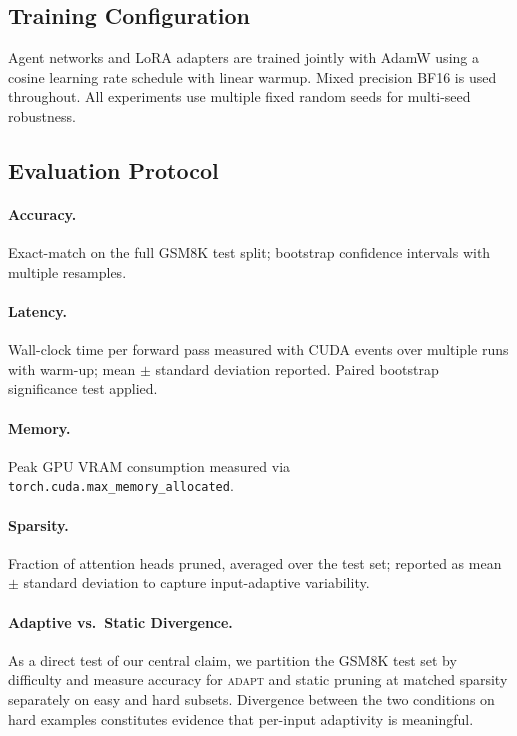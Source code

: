 \documentclass{article}
\newcommand{\system}{\textsc{adapt}}
\begin{document}
\subsection{Training Configuration}
\label{sec:exp_training}

Agent networks and LoRA adapters are trained jointly with AdamW
\citep{loshchilov2019decoupled} using a cosine learning rate schedule with linear warmup.
Mixed precision BF16 is used throughout. All experiments use multiple fixed random seeds
for multi-seed robustness.

\subsection{Evaluation Protocol}
\label{sec:exp_eval}

\paragraph{Accuracy.} Exact-match on the full GSM8K test split; bootstrap confidence
intervals with multiple resamples.

\paragraph{Latency.} Wall-clock time per forward pass measured with CUDA events over
multiple runs with warm-up; mean $\pm$ standard deviation reported. Paired bootstrap
significance test applied.

\paragraph{Memory.} Peak GPU VRAM consumption measured via
\texttt{torch.cuda.max\_memory\_allocated}.

\paragraph{Sparsity.} Fraction of attention heads pruned, averaged over the test set;
reported as mean $\pm$ standard deviation to capture input-adaptive variability.

\paragraph{Adaptive vs.\ Static Divergence.}
As a direct test of our central claim, we partition the GSM8K test set by difficulty and
measure accuracy for \system{} and static pruning at matched sparsity separately on easy
and hard subsets. Divergence between the two conditions on hard examples constitutes
evidence that per-input adaptivity is meaningful.
\end{document}
